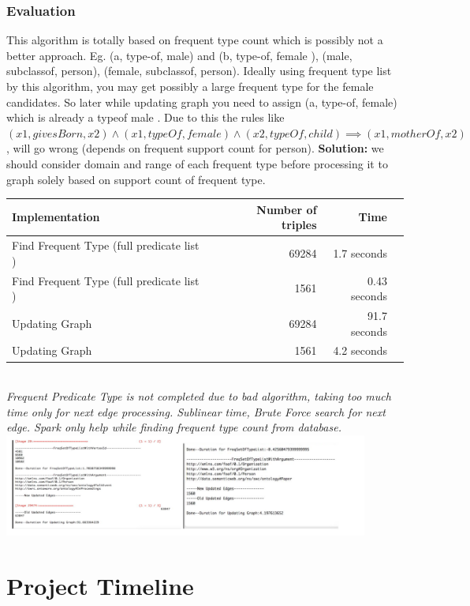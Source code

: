 \documentclass{easychair}
\begin{document}
\subsubsection{Evaluation}
This algorithm is totally based on frequent type count which is possibly not a better  approach. Eg. (a, type-of, male) and (b, type-of, female ), (male, subclassof, person), (female, subclassof, person). Ideally using frequent type list by this algorithm, you may get possibly a large frequent type for the female candidates. So later while updating graph you need to assign (a, type-of, female) which is already a typeof male . Due to this the rules like $(x1, givesBorn, x2) \land (x1, typeOf, female)\land (x2, typeOf, child) \implies (x1, motherOf, x2)$, will go wrong (depends on frequent support count for person).
\textbf{Solution:} we should consider domain and range of each frequent type before processing it to graph solely based on support count of frequent type.\\

\begin{tabular}{lrrr}
    \hline
     Implementation            & Number of triples & Time   \\
   \hline
    Find Frequent Type (full predicate list )      &  69284 & 1.7 seconds  \\
     Find Frequent Type (full predicate list )      &  1561 & 0.43 seconds  \\
    Updating Graph     &  69284 & 91.7 seconds  \\
    Updating Graph     &  1561 & 4.2 seconds \\

   \hline
  \end{tabular}\\

\emph{Frequent Predicate Type is  not completed due to bad algorithm, taking too much time only for next edge processing. Sublinear time, Brute Force search for next edge. Spark only help while finding frequent type count from database.
}\\

\includegraphics[width=0.9\textwidth]{akhilesh_result.png}
\section{Project Timeline}
\end{document}
